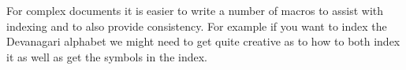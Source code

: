 For complex documents it is easier to write a number of macros to assist with indexing and to also provide consistency. For example if you want to index the Devanagari alphabet we might need to get quite creative as to how to both index it as well as get the symbols in the index.
\DeclareRobustCommand\ta{{\tibetan ༃ }}

%
%
%























